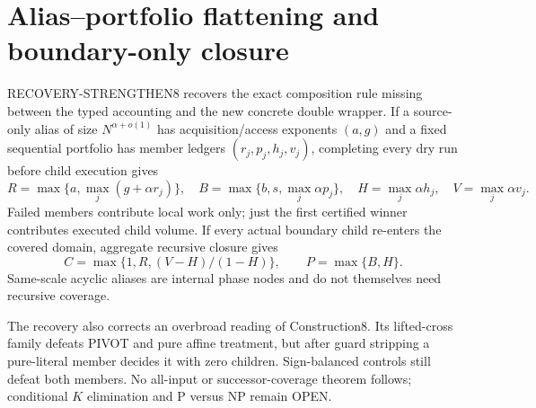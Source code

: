 \section{Alias--portfolio flattening and boundary-only closure}
RECOVERY-STRENGTHEN8 recovers the exact composition rule missing between the
typed accounting and the new concrete double wrapper.  If a source-only alias
of size $N^{\alpha+o(1)}$ has acquisition/access exponents $(a,g)$ and a
fixed sequential portfolio has member ledgers $(r_j,p_j,h_j,v_j)$, completing
every dry run before child execution gives
\[
 R=\max\{a,\max_j(g+\alpha r_j)\},\quad
 B=\max\{b,s,\max_j\alpha p_j\},\quad
 H=\max_j\alpha h_j,\quad V=\max_j\alpha v_j.
\]
Failed members contribute local work only; just the first certified winner
contributes executed child volume.  If every actual boundary child re-enters
the covered domain, aggregate recursive closure gives
\[
 C=\max\{1,R,(V-H)/(1-H)\},\qquad P=\max\{B,H\}.
\]
Same-scale acyclic aliases are internal phase nodes and do not themselves
need recursive coverage.

The recovery also corrects an overbroad reading of Construction8.  Its
lifted-cross family defeats PIVOT and pure affine treatment, but after guard
stripping a pure-literal member decides it with zero children.  Sign-balanced
controls still defeat both members.  No all-input or successor-coverage
theorem follows; conditional $K$ elimination and P versus NP remain OPEN.
